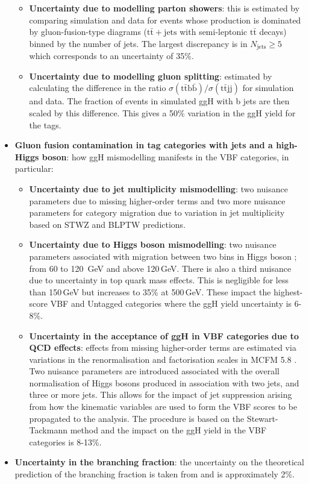 \begin{itemize}[noitemsep]
{\begin{itemize}[noitemsep]
            \item[\textbullet] \textbf{Uncertainty due to modelling parton showers}: this is estimated by comparing simulation and data for events whose production is dominated by gluon-fusion-type diagrams ($\mathrm{t}\bar{\mathrm{t}}+\mathrm{jets}$ with semi-leptonic $\mathrm{t}\bar{\mathrm{t}}$ decays) binned by the number of jets. The largest discrepancy is in $N_{\mathrm{jets}}\geq{5}$ which corresponds to an uncertainty of 35\%.
            \item[\textbullet] \textbf{Uncertainty due to modelling gluon splitting}: estimated by calculating the difference in the ratio $\sigma(\mathrm{t\bar{t}b\bar{b}})/\sigma(\mathrm{t\bar{t}jj})$ for simulation and data. The fraction of events in simulated ggH with b jets are then scaled by this difference. This gives a 50\% variation in the ggH yield for the \ttH tags. 
        \end{itemize}}
    \item{\textbf{Gluon fusion contamination in tag categories with jets and a high-\pt Higgs boson}: how ggH mismodelling manifests in the VBF categories, in particular:
        \begin{itemize}[noitemsep]
            \item[\textbullet] \textbf{Uncertainty due to jet multiplicity mismodelling}: two nuisance parameters due to missing higher-order terms and two more nuisance parameters for category migration due to variation in jet multiplicity based on STWZ \cite{JetPtResum} and BLPTW \cite{JetPtResum,TheoryUncertHiggs1J,ResummedHiggsPredictions} predictions. 
            \item[\textbullet] \textbf{Uncertainty due to Higgs boson \pt mismodelling}: two nuisance parameters associated with migration between two bins in Higgs boson \pt; from 60 to 120 \,GeV and above 120\,GeV. There is also a third nuisance due to uncertainty in top quark mass effects. This is negligible for \pt less than 150\,GeV but increases to 35\% at 500\,GeV. These impact the highest-score VBF and Untagged categories where the ggH yield uncertainty is 6-8\%.
            \item[\textbullet] \textbf{Uncertainty in the acceptance of ggH in VBF categories due to QCD effects}: effects from missing higher-order terms are estimated via variations in the renormalisation and factorisation scales in MCFM 5.8 \cite{MCFM}. Two nuisance parameters are introduced associated with the overall normalisation of Higgs bosons produced in association with two jets, and three or more jets. This allows for the impact of jet suppression arising from how the kinematic variables are used to form the VBF scores to be propagated to the analysis. The procedure is based on the Stewart-Tackmann method \cite{StewartTackmann,GangalTackmann} and the impact on the ggH yield in the VBF categories is 8-13\%. 
        \end{itemize}}
    \item{\textbf{Uncertainty in the \Hgg branching fraction}: the uncertainty on the theoretical prediction of the \Hgg branching fraction is taken from \cite{LHCHXS} and is approximately 2\%.}
\end{itemize}

